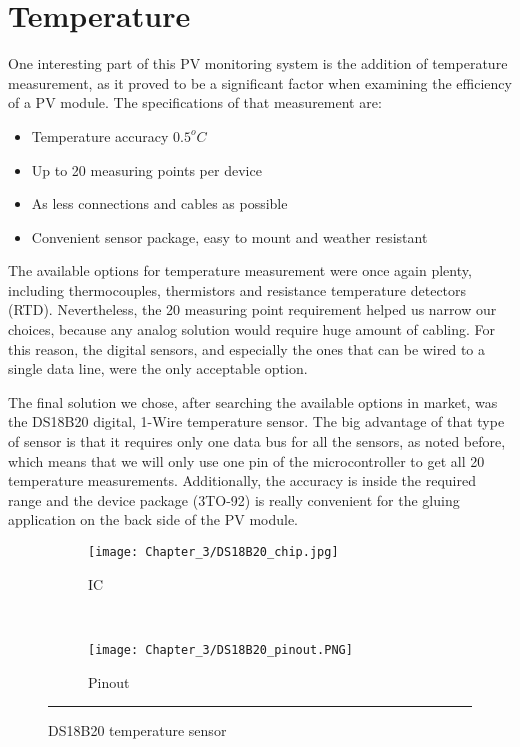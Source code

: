 \section{Temperature}
One interesting part of this PV monitoring system is the addition of temperature measurement, as it proved to be a significant factor when examining the efficiency of a PV module. The specifications of that measurement are:

\begin{itemize}
    \item Temperature accuracy $0.5^oC$
    \item Up to 20 measuring points per device
    \item As less connections and cables as possible
    \item Convenient sensor package, easy to mount and weather resistant
\end{itemize}

The available options for temperature measurement were once again plenty, including thermocouples, thermistors and  resistance temperature detectors (RTD). Nevertheless, the 20 measuring point requirement helped us narrow our choices, because any analog solution would require huge amount of cabling. For this reason, the digital sensors, and especially the ones that can be wired to a single data line, were the only acceptable option.

The final solution we chose, after searching the available options in market, was the DS18B20 digital, 1-Wire temperature sensor. The big advantage of that type of sensor is that it requires only one data bus for all the sensors, as noted before, which means that we will only use one pin of the microcontroller to get all 20 temperature measurements. Additionally, the accuracy is inside the required range and the device package (3TO-92) is really convenient for the gluing application on the back side of the PV module.\\

\begin{figure}[htbp]
	\centering
	\begin{subfigure}[b]{.4\textwidth}
		\texttt{[image: Chapter\_3/DS18B20\_chip.jpg]}
	    \caption[]{IC}
	    \label{fig:DS18B20_chip}
	\end{subfigure}
    ~
	\begin{subfigure}[b]{.1\textwidth}
		\texttt{[image: Chapter\_3/DS18B20\_pinout.PNG]}
	    \caption[]{Pinout}
	    \label{fig:DS18B20_pinout}
	\end{subfigure}
	\rule{35em}{0.5pt}
	\caption{DS18B20 temperature sensor}
	\label{fig:DS18B20}
\end{figure}

